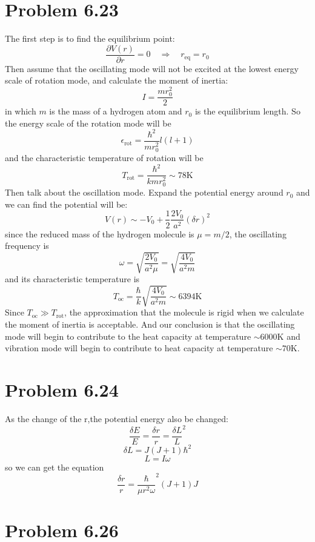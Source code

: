 \documentclass{article}
\begin{document}
\section*{Problem 6.23}
The first step is to find the equilibrium point:
$$
\frac{\partial V(r)}{\partial r} = 0\quad\Rightarrow\quad r_{\mathrm{eq}} = r_0 
$$
Then assume that the oscillating mode will not be excited at the lowest energy scale of rotation mode, and calculate the moment of inertia:
$$
I = \frac{mr_0^2}{2}
$$
in which $m$ is the mass of a hydrogen atom and $r_0$ is the equilibrium length. So the energy scale of the rotation mode will be
\begin{equation}
\epsilon_{\mathrm{rot}} = \frac{\hbar^2}{mr_0^2}l(l+1)
\end{equation}
and the characteristic temperature of rotation will be
$$
T_{\mathrm{rot}} = \frac{\hbar^2}{kmr_0^2} \sim 78\mathrm{K}
$$
Then talk about the oscillation mode. Expand the potential energy around $r_0$ and we can find the potential will be:
\begin{equation}
V(r)\sim -V_0 + \frac{1}{2}\frac{2V_0}{a^2}(\delta r)^2
\end{equation}
since the reduced mass of the hydrogen molecule is $\mu = m/2$, the oscillating frequency is
\begin{equation}
\omega = \sqrt{\frac{2V_0}{a^2\mu}} = \sqrt{\frac{4V_0}{a^2 m}}
\end{equation}
and its characteristic temperature is
$$
T_{\mathrm{oc}} = \frac{\hbar}{k}\sqrt{\frac{4V_0}{a^2 m}}\sim 6394\mathrm{K}
$$
Since $T_{\mathrm{oc}}\gg T_\mathrm{rot}$, the approximation that the molecule is rigid when we calculate the moment of inertia is acceptable. And our conclusion is that the oscillating mode will begin to contribute to the heat capacity at temperature $\sim 6000\mathrm{K}$ and vibration mode will begin to contribute to heat capacity at temperature $\sim 70\mathrm{K}$.



\section*{Problem 6.24}
As the change of the r,the potential energy also be changed:
$$\frac{\delta E}{E}=\frac{\delta r}{r}=\frac{\delta L}{L}^2$$
$$\delta L=J(J+1)\hbar^2$$
$$L=I\omega$$
so we can get the equation 
$$\frac{\delta r}{r}=\frac{\hbar}{\mu r^2\omega}^2(J+1)J$$

\section*{Problem 6.26} %
\label{sec:problem_6_26}
	
\end{document}
